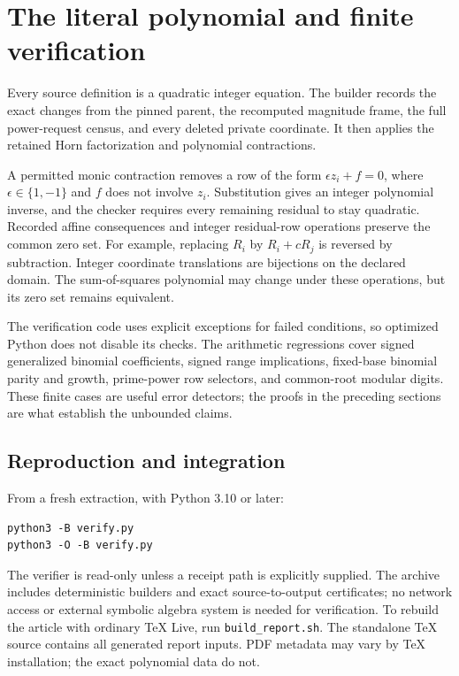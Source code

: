 \documentclass[11pt]{article}
\theoremstyle{remark}\newtheorem{remark}[theorem]{Remark}
\begin{document}
\section{The literal polynomial and finite verification}

Every source definition is a quadratic integer equation. The builder
records the exact changes from the pinned parent, the recomputed
magnitude frame, the full power-request census, and every deleted
private coordinate. It then applies the retained Horn factorization
and polynomial contractions.

A permitted monic contraction removes a row of the form
$\epsilon z_i+f=0$, where $\epsilon\in\{1,-1\}$ and $f$ does
not involve $z_i$. Substitution gives an integer polynomial inverse,
and the checker requires every remaining residual to stay quadratic.
Recorded affine consequences and integer residual-row operations
preserve the common zero set. For example, replacing $R_i$ by
$R_i+cR_j$ is reversed by subtraction. Integer coordinate translations
are bijections on the declared domain. The sum-of-squares polynomial
may change under these operations, but its zero set remains equivalent.



The verification code uses explicit exceptions for failed conditions,
so optimized Python does not disable its checks. The arithmetic
regressions cover signed generalized binomial coefficients, signed
range implications, fixed-base binomial parity and growth, prime-power
row selectors, and common-root modular digits. These finite cases
are useful error detectors; the proofs in the preceding sections are
what establish the unbounded claims.

\subsection{Reproduction and integration}

From a fresh extraction, with Python 3.10 or later:
\begin{verbatim}
python3 -B verify.py
python3 -O -B verify.py
\end{verbatim}
The verifier is read-only unless a receipt path is explicitly supplied.
The archive includes deterministic builders and exact source-to-output
certificates; no network access or external symbolic algebra system is
needed for verification. To rebuild the article with ordinary TeX Live,
run \nolinkurl{build_report.sh}. The standalone TeX source contains
all generated report inputs. PDF metadata may vary by TeX installation;
the exact polynomial data do not.
\end{document}
